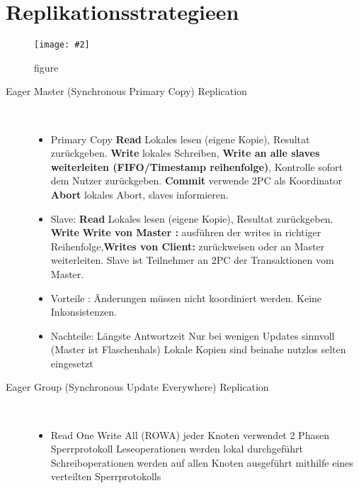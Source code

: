 \documentclass[a4paper,10pt,titlepage=false]{scrreprt}
\newcommand{\pic}[2][figure]{\begin{figure}[h]
 \centering
 \texttt{[image: \#2]}
 \caption{#1}
\end{figure}
}
\begin{document}
\section{Replikationsstrategieen} %
\label{sec:replikationsstrategieen}
\pic{ups1.png}
\begin{description}
  \item[Eager Master (Synchronous Primary Copy) Replication] \hfill \\
  \begin{itemize}
    \item Primary Copy 
    \subitem \textbf{Read}  Lokales lesen (eigene Kopie), Resultat zurückgeben.
    \subitem \textbf{Write}  lokales Schreiben, \textbf{Write an alle slaves weiterleiten (FIFO/Timestamp reihenfolge)}, Kontrolle sofort dem Nutzer zurückgeben.
    \subitem \textbf{Commit} verwende 2PC als Koordinator
    \subitem \textbf{Abort} lokales Abort, slaves informieren.
    \item Slave:
      \subitem \textbf{Read}  Lokales lesen (eigene Kopie), Resultat zurückgeben.
    \subitem \textbf{Write}  \textbf{Write von Master :} ausführen der writes in richtiger Reihenfolge,\textbf{Writes von Client:} zurückweisen oder an Master weiterleiten. 
    \subitem Slave ist Teilnehmer an 2PC der Transaktionen vom Master.
    \item Vorteile : 
    \subitem Änderungen müssen nicht koordiniert werden.
\subitem Keine Inkonsistenzen.
\item Nachteile:
\subitem Längste Antwortzeit
\subitem Nur bei wenigen Updates sinnvoll (Master ist
Flaschenhals)
\subitem Lokale Kopien sind beinahe nutzlos
\subitem selten eingesetzt

  \end{itemize}
\item[Eager Group (Synchronous Update Everywhere) Replication] \hfill  \\
\begin{itemize}
  \item Read One Write All (ROWA)
\subitem jeder Knoten verwendet 2 Phasen Sperrprotokoll
\subitem Leseoperationen werden lokal durchgeführt
\subitem Schreiboperationen werden auf allen Knoten
ausgeführt mithilfe eines verteilten Sperrprotokolls


\end{itemize}
\end{description}
\end{document}

